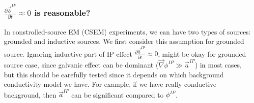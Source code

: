 \documentclass[a4paper, 11pt]{article}
\newcommand{\grad}{\vec \nabla}
\renewcommand {\b}  { {\vec b} }
\begin{document}
\subsubsection{$\frac{\partial \b^{IP}}{\partial t}\approx 0$ is reasonable?}

In constrolled-source EM (CSEM) experiments, we can have two types of sources: grounded and inductive sources. We first consider this assumption for grounded source. Ignoring inductive part of IP effect $\frac{\partial \b^{IP}}{\partial t}\approx 0$, might be okay for grounded source case, since galvanic effect  can be dominant ($\grad\phi^{IP} \gg \vec{a}^{IP}$) in most cases, but this should be carefully tested since it depends on which background conductivity model we have. For example, if we have really conductive background, then $\vec{a}^{IP}$ can be significant compared to $\phi^{IP}$.
\end{document}
